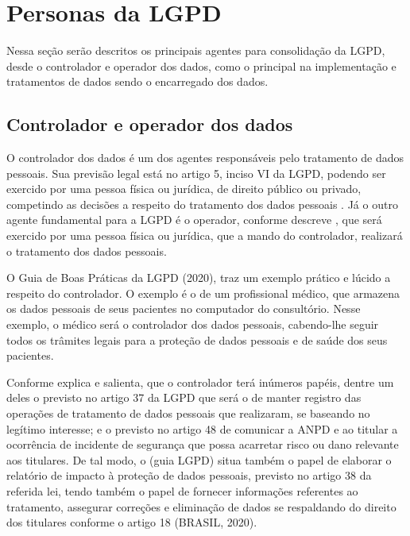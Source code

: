 \documentclass[
	12pt,				%
	openright,			%
	oneside,			%
	a4paper,			%
	english,			%
	french,				%
	spanish,			%
	brazil,				%
	]{abntex2}
\begin{document}
\section{Personas da LGPD}
\label{sec: exemplo2}

Nessa seção serão descritos os principais agentes para consolidação da LGPD, desde o controlador e operador dos dados, como o principal na implementação e tratamentos de dados sendo o encarregado dos dados.

\subsection{Controlador e operador dos dados}

O controlador dos dados é um dos agentes responsáveis pelo tratamento de dados pessoais. Sua previsão legal está no artigo 5, inciso VI da LGPD, podendo ser exercido por uma pessoa física ou jurídica, de direito público ou privado, competindo as decisões a respeito do tratamento dos dados pessoais \cite{01-01-LeiGeral}. Já o outro agente fundamental para a LGPD é o operador, conforme descreve \cite{Pohlmann2019}, que será exercido por uma pessoa física ou jurídica, que a mando do controlador, realizará o tratamento dos dados pessoais.

O Guia de Boas Práticas da LGPD (2020), traz um exemplo prático e lúcido a respeito do controlador. O exemplo é o de um profissional médico, que armazena os dados pessoais de seus pacientes no computador do consultório. Nesse exemplo, o médico será o controlador dos dados pessoais, cabendo-lhe seguir todos os trâmites legais para a proteção de dados pessoais e de saúde dos seus pacientes.

Conforme  explica e salienta, que o controlador terá inúmeros papéis, dentre um deles o previsto no artigo 37 da LGPD que será o de manter registro das operações de tratamento de dados pessoais que realizaram, se baseando no legítimo interesse; e o previsto no artigo 48 de comunicar a ANPD e ao titular a ocorrência de incidente de segurança que possa acarretar risco ou dano relevante aos titulares. De tal modo, o (guia LGPD) situa também o papel de elaborar o relatório de impacto à proteção de dados pessoais, previsto no artigo 38 da referida lei, tendo também o papel de fornecer informações referentes ao tratamento, assegurar correções e eliminação de dados se respaldando do direito dos titulares conforme o artigo 18 (BRASIL, 2020).
\end{document}
